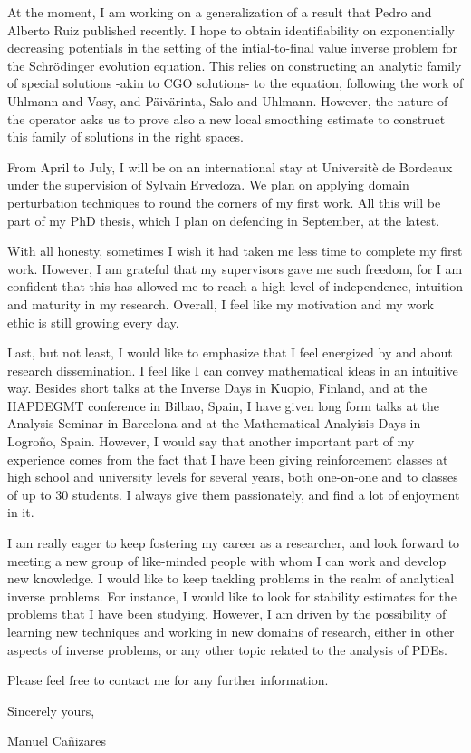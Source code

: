 \documentclass{article}
\begin{document}
At the moment, I am working on a generalization of a result that Pedro and Alberto Ruiz published recently. I hope to obtain identifiability on exponentially decreasing potentials in the setting of the intial-to-final value inverse problem for the Schr\"odinger evolution equation. This relies on constructing an analytic family of special solutions -akin to CGO solutions- to the equation, following the work of Uhlmann and Vasy, and P\"aiv\"arinta, Salo and Uhlmann. However, the nature of the operator asks us to prove also a new local smoothing estimate to construct this family of solutions in the right spaces.

From April to July, I will be on an international stay at Universit\`{e} de Bordeaux under the supervision of Sylvain Ervedoza. We plan on applying domain perturbation techniques to round the corners of my first work. All this will be part of my PhD thesis, which I plan on defending in September, at the latest.

With all honesty, sometimes I wish it had taken me less time to complete my first work. However, I am grateful that my supervisors gave me such freedom, for I am confident that this has allowed me to reach a high level of independence, intuition and maturity in my research. Overall, I feel like my motivation and my work ethic is still growing every day.

Last, but not least, I would like to emphasize that I feel energized by and about research dissemination. I feel like I can convey mathematical ideas in an intuitive way. Besides short talks at the Inverse Days in Kuopio, Finland, and at the HAPDEGMT conference in Bilbao, Spain, I have given long form talks at the Analysis Seminar in Barcelona and at the Mathematical Analyisis Days in Logro\~no, Spain. However, I would say that another important part of my experience comes from the fact that I have been giving reinforcement classes at high school and university levels for several years, both one-on-one and to classes of up to 30 students. I always give them passionately, and find a lot of enjoyment in it.

I am really eager to keep fostering my career as a researcher, and look forward to meeting a new group of like-minded people with whom I can work and develop new knowledge. I would like to keep tackling problems in the realm of analytical inverse problems. For instance, I would like to look for stability estimates for the problems that I have been studying. However, I am driven by the possibility of learning new techniques and working in new domains of research, either in other aspects of inverse problems, or any other topic related to the analysis of PDEs.

Please feel free to contact me for any further information.
\bigskip %

Sincerely yours,


Manuel Ca\~{n}izares\\
\end{document}
